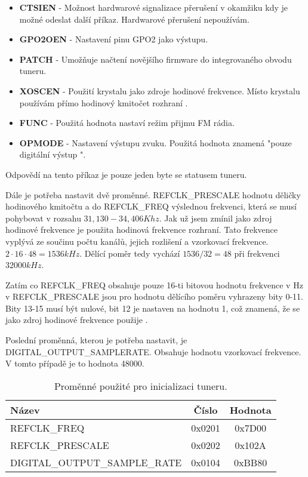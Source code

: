 \begin{itemize}
\item \textbf{CTSIEN} - Možnost hardwarové signalizace přerušení v okamžiku kdy je možné odeslat další příkaz. Hardwarové přerušení nepoužívám.
\item \textbf{GPO2OEN} - Nastavení pinu GPO2 jako výstupu.
\item \textbf{PATCH} - Umožňuje načtení novějšího firmware do integrovaného obvodu tuneru.
\item \textbf{XOSCEN} - Použití krystalu jako zdroje hodinové frekvence. Místo krystalu používám přímo hodinový kmitočet rozhraní \iis.
\item \textbf{FUNC} - Použitá hodnota nastaví režim přijmu FM rádia.
\item \textbf{OPMODE} - Nastavení výstupu zvuku. Použitá hodnota znamená "pouze digitální výstup \iis".
\end{itemize}

Odpovědí na tento příkaz je pouze jeden byte se statusem tuneru.

Dále je potřeba nastavit dvě proměnné. REFCLK\_PRESCALE hodnotu děličky hodinového kmitočtu a do REFCLK\_FREQ výslednou frekvenci, která se musí pohybovat v rozsahu $ 31,130 - 34,406 Khz $. Jak už jsem zmínil jako zdroj hodinové frekvence je použita hodinová frekvence \iis rozhraní. Tato frekvence vyplývá ze součinu počtu kanálů, jejich rozlišení a vzorkovací frekvence. $ 2 \cdot 16 \cdot 48 = 1536 kHz $. Dělící poměr tedy vychází $ 1536 / 32 = 48 $ při frekvenci $ 32000 kHz $.

Zatím co REFCLK\_FREQ obsahuje pouze 16-ti bitovou hodnotu frekvence v Hz v REFCLK\_PRESCALE jsou pro hodnotu dělícího poměru vyhrazeny bity 0-11. Bity 13-15 musí být nulové, bit 12 je nastaven na hodnotu 1, což znamená, že se jako zdroj hodinové frekvence použije \iis.

Poslední proměnná, kterou je potřeba nastavit, je DIGITAL\_OUTPUT\_SAMPLERATE. Obsahuje hodnotu vzorkovací frekvence. V tomto případě je to hodnota 48000.

\begin{table}[ht!]
\begin{center}
\begin{tabular}{|l|c|c|}
\hline 
Název & Číslo & Hodnota \\ 
\hline 
REFCLK\_FREQ & 0x0201 & 0x7D00 \\ 
\hline 
REFCLK\_PRESCALE & 0x0202 & 0x102A \\ 
\hline 
DIGITAL\_OUTPUT\_SAMPLE\_RATE & 0x0104 & 0xBB80 \\ 
\hline 
\end{tabular} 
\end{center}
\caption{Proměnné použité pro inicializaci tuneru.}
\label{tab:tuner-init-prop} 
\end{table}

